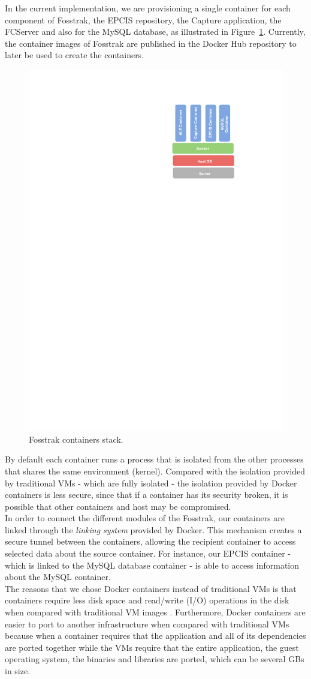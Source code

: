 In the current implementation, we are provisioning a single container for each component of Fosstrak, the \gls{EPCIS} repository,
the Capture application, the \gls{FCServer} and also for the MySQL database, as illustrated in Figure~\ref{fig:impl_containers}.
Currently, the container images of Fosstrak are published in the Docker Hub repository
to later be used to create the containers.\\

\begin{figure}[!ht]
\centering
\includegraphics[width=.3\textwidth]{./images/docker-stack}
\caption[Fosstrak containers stack.]{Fosstrak containers stack.}
\label{fig:impl_containers}
\end{figure}

By default each container runs a process that is isolated from the other processes that shares the same
environment (kernel). Compared with the isolation provided by traditional \glspl{VM} - which are fully
isolated - the isolation provided by Docker containers is less secure, since that if a container has
its security broken, it is possible that other containers and host may be compromised.\\

In order to connect the different modules of the Fosstrak, our containers are
linked through the \textit{linking system} provided by Docker. This mechanism creates a secure tunnel
between the containers, allowing the recipient container to access selected data about the source container.
For instance, our \gls{EPCIS} container - which is linked to the MySQL database container - is able to
access information about the MySQL container.\\

The reasons that we chose Docker containers instead of traditional \glspl{VM} is that containers
require less disk space and read/write (I/O) operations in the disk when compared with traditional
\gls{VM} images \cite{merkel2014docker}. Furthermore, Docker containers are easier to port to another
infrastructure when compared with traditional \glspl{VM} because when a container requires that the
application and all of its dependencies are ported together while the \glspl{VM} require that the
entire application, the guest operating system, the binaries and libraries are ported, which can be
several \glspl{GB} in size.

